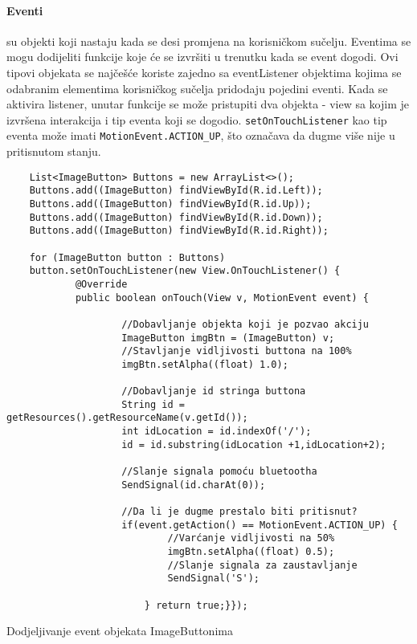\documentclass[../Document.tex]{subfiles}
\begin{document}
\paragraph{Eventi}  su objekti koji nastaju kada se desi promjena na korisničkom sučelju. Eventima se mogu dodijeliti funkcije koje će se izvršiti u trenutku kada se event dogodi. Ovi tipovi objekata se najčešće koriste zajedno sa eventListener objektima kojima se odabranim elementima korisničkog sučelja pridodaju pojedini eventi. Kada se aktivira listener, unutar funkcije se može pristupiti dva objekta - view sa kojim je izvršena interakcija i tip eventa koji se dogodio. \verb|setOnTouchListener| kao tip eventa može imati \verb|MotionEvent.ACTION_UP|, što označava da dugme više nije u pritisnutom stanju.

\begin{code}
    \begin{verbatim}
    List<ImageButton> Buttons = new ArrayList<>();
    Buttons.add((ImageButton) findViewById(R.id.Left));
    Buttons.add((ImageButton) findViewById(R.id.Up));
    Buttons.add((ImageButton) findViewById(R.id.Down));
    Buttons.add((ImageButton) findViewById(R.id.Right));

    for (ImageButton button : Buttons)
    button.setOnTouchListener(new View.OnTouchListener() {
            @Override
            public boolean onTouch(View v, MotionEvent event) {

                    //Dobavljanje objekta koji je pozvao akciju
                    ImageButton imgBtn = (ImageButton) v;
                    //Stavljanje vidljivosti buttona na 100%
                    imgBtn.setAlpha((float) 1.0);

                    //Dobavljanje id stringa buttona
                    String id = getResources().getResourceName(v.getId());
                    int idLocation = id.indexOf('/');
                    id = id.substring(idLocation +1,idLocation+2);

                    //Slanje signala pomoću bluetootha
                    SendSignal(id.charAt(0));

                    //Da li je dugme prestalo biti pritisnut?
                    if(event.getAction() == MotionEvent.ACTION_UP) {
                            //Varćanje vidljivosti na 50%
                            imgBtn.setAlpha((float) 0.5);
                            //Slanje signala za zaustavljanje
                            SendSignal('S');

                        } return true;}});
    \end{verbatim}
    \caption{Dodjeljivanje event objekata ImageButtonima}
\end{code}
\end{document}
